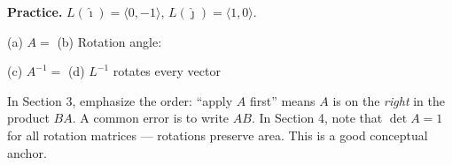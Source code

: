 \documentclass[10pt]{article}
\begin{document}
\vspace{0.06in}

\begin{practicebox}
\small
\textbf{Practice.} $L(\hat{\imath})=\langle0,-1\rangle$, $L(\hat{\jmath})=\langle1,0\rangle$.

(a) $A = $  \qquad
(b) Rotation angle:  \qquad

(c) $A^{-1} = $  \qquad
(d) $L^{-1}$ rotates every vector 
\end{practicebox}

\begin{teachernote}
In Section 3, emphasize the order: ``apply $A$ first'' means $A$ is on the \emph{right} in the
product $BA$. A common error is to write $AB$. In Section 4, note that $\det A = 1$ for all
rotation matrices --- rotations preserve area. This is a good conceptual anchor.
\end{teachernote}
\end{document}
